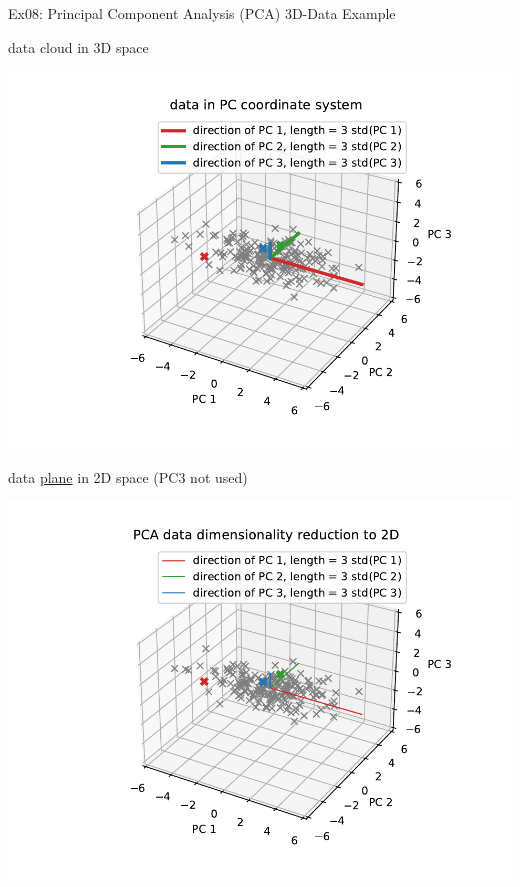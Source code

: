 \documentclass[mathserif, aspectratio=1610]{intbeamer}
\begin{document}
\begin{frame}[t]{Ex08: Principal Component Analysis (PCA) 3D-Data Example}
\begin{minipage}[t]{0.49\textwidth}
data cloud in 3D space

\includegraphics[width=\textwidth]{pca_3d_pc_data.pdf}
\end{minipage}
%
\begin{minipage}[t]{0.49\textwidth}
data \underline{plane} in 2D space (PC3 not used)

\includegraphics[width=\textwidth]{pca_3d_dim_red.pdf}
\end{minipage}
\end{frame}
\end{document}
